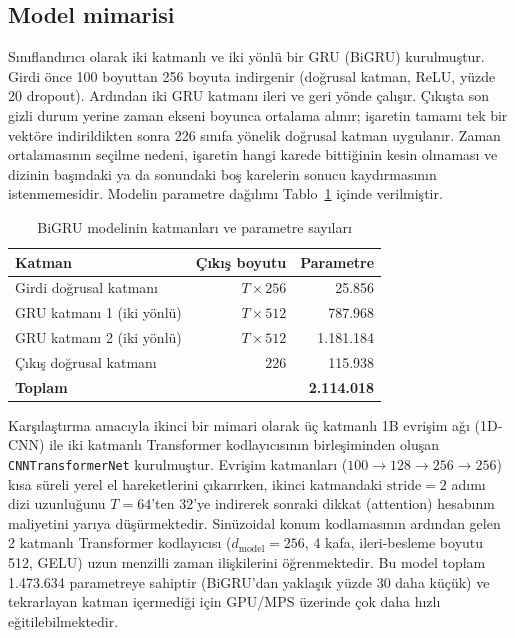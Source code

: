 \subsection{Model mimarisi}

Sınıflandırıcı olarak iki katmanlı ve iki yönlü bir GRU (BiGRU) kurulmuştur.
Girdi önce 100 boyuttan 256 boyuta indirgenir (doğrusal katman, ReLU, yüzde 20
dropout). Ardından iki GRU katmanı ileri ve geri yönde çalışır. Çıkışta son gizli
durum yerine zaman ekseni boyunca ortalama alınır; işaretin tamamı tek bir vektöre
indirildikten sonra 226 sınıfa yönelik doğrusal katman uygulanır. Zaman
ortalamasının seçilme nedeni, işaretin hangi karede bittiğinin kesin olmaması ve
dizinin başındaki ya da sonundaki boş karelerin sonucu kaydırmasının
istenmemesidir. Modelin parametre dağılımı Tablo~\ref{tab:model} içinde
verilmiştir.

\begin{table}[H]
\centering
\caption{BiGRU modelinin katmanları ve parametre sayıları}
\label{tab:model}
\begin{tabular}{lrr}
\toprule
\textbf{Katman} & \textbf{Çıkış boyutu} & \textbf{Parametre} \\
\midrule
Girdi doğrusal katmanı & $T\times256$ & 25.856 \\
GRU katmanı 1 (iki yönlü) & $T\times512$ & 787.968 \\
GRU katmanı 2 (iki yönlü) & $T\times512$ & 1.181.184 \\
Çıkış doğrusal katmanı & 226 & 115.938 \\
\midrule
\textbf{Toplam} & & \textbf{2.114.018} \\
\bottomrule
\end{tabular}
\end{table}

Karşılaştırma amacıyla ikinci bir mimari olarak üç katmanlı 1B evrişim ağı
(1D-CNN) ile iki katmanlı Transformer kodlayıcısının birleşiminden oluşan
\texttt{CNNTransformerNet} kurulmuştur. Evrişim katmanları
($100\rightarrow 128\rightarrow 256\rightarrow 256$)
kısa süreli yerel el hareketlerini çıkarırken, ikinci katmandaki $\text{stride}=2$
adımı dizi uzunluğunu $T=64$'ten $32$'ye indirerek sonraki dikkat (attention)
hesabının maliyetini yarıya düşürmektedir. Sinüzoidal konum kodlamasının ardından
gelen 2 katmanlı Transformer kodlayıcısı ($d_{\text{model}}=256$, 4 kafa,
ileri-besleme boyutu 512, GELU) uzun menzilli zaman ilişkilerini öğrenmektedir.
Bu model toplam 1.473.634 parametreye sahiptir (BiGRU'dan yaklaşık yüzde 30 daha
küçük) ve tekrarlayan katman içermediği için GPU/MPS üzerinde çok daha hızlı
eğitilebilmektedir.

